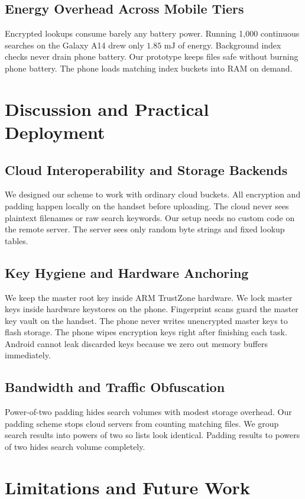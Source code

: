 \documentclass[10pt, conference, letterpaper]{IEEEtran}
\begin{document}
\subsection{Energy Overhead Across Mobile Tiers}
Encrypted lookups consume barely any battery power. Running 1,000 continuous searches on the Galaxy A14 drew only $1.85\text{ mJ}$ of energy. Background index checks never drain phone battery. Our prototype keeps files safe without burning phone battery. The phone loads matching index buckets into RAM on demand.

\section{Discussion and Practical Deployment}
\subsection{Cloud Interoperability and Storage Backends}
We designed our scheme to work with ordinary cloud buckets. All encryption and padding happen locally on the handset before uploading. The cloud never sees plaintext filenames or raw search keywords. Our setup needs no custom code on the remote server. The server sees only random byte strings and fixed lookup tables.

\subsection{Key Hygiene and Hardware Anchoring}
We keep the master root key inside ARM TrustZone hardware. We lock master keys inside hardware keystores on the phone. Fingerprint scans guard the master key vault on the handset. The phone never writes unencrypted master keys to flash storage. The phone wipes encryption keys right after finishing each task. Android cannot leak discarded keys because we zero out memory buffers immediately.

\subsection{Bandwidth and Traffic Obfuscation}
Power-of-two padding hides search volumes with modest storage overhead. Our padding scheme stops cloud servers from counting matching files. We group search results into powers of two so lists look identical. Padding results to powers of two hides search volume completely.

\section{Limitations and Future Work}
\end{document}

